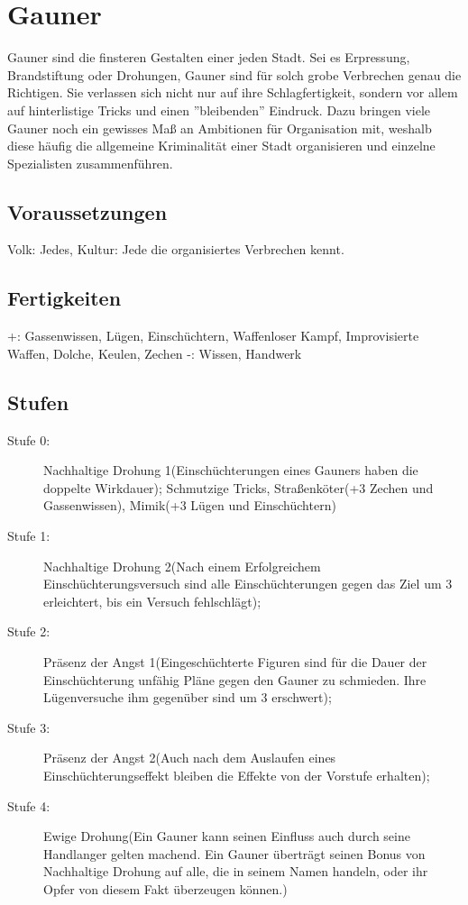 \documentclass[a4paper,12pt,oneside]{book}
\begin{document}
\section{Gauner}
Gauner sind die finsteren Gestalten einer jeden Stadt. Sei es Erpressung, Brandstiftung oder Drohungen, Gauner sind für solch grobe Verbrechen genau die Richtigen. Sie verlassen sich nicht nur auf ihre Schlagfertigkeit, sondern vor allem auf hinterlistige Tricks und einen ''bleibenden'' Eindruck. Dazu bringen viele Gauner noch ein gewisses Maß an Ambitionen für Organisation mit, weshalb diese häufig die allgemeine Kriminalität einer Stadt organisieren und einzelne Spezialisten zusammenführen.
\subsection{Voraussetzungen}
Volk: Jedes, Kultur: Jede die organisiertes Verbrechen kennt.
\subsection{Fertigkeiten}
+: Gassenwissen, Lügen, Einschüchtern, Waffenloser Kampf, Improvisierte Waffen, Dolche, Keulen, Zechen
-: Wissen, Handwerk
\subsection{Stufen}
\begin{description}
\item[Stufe 0:] Nachhaltige Drohung 1(Einschüchterungen eines Gauners haben die doppelte Wirkdauer); Schmutzige Tricks, Straßenköter(+3 Zechen und Gassenwissen), Mimik(+3 Lügen und Einschüchtern) 
\item[Stufe 1:] Nachhaltige Drohung 2(Nach einem Erfolgreichem Einschüchterungsversuch sind alle Einschüchterungen gegen das Ziel um 3 erleichtert, bis ein Versuch fehlschlägt);
\item[Stufe 2:] Präsenz der Angst 1(Eingeschüchterte Figuren sind für die Dauer der Einschüchterung unfähig Pläne gegen den Gauner zu schmieden. Ihre Lügenversuche ihm gegenüber sind um 3 erschwert);
\item[Stufe 3:] Präsenz der Angst 2(Auch nach dem Auslaufen eines Einschüchterungseffekt bleiben die Effekte von der Vorstufe erhalten);
\item[Stufe 4:] Ewige Drohung(Ein Gauner kann seinen Einfluss auch durch seine Handlanger gelten machend. Ein Gauner überträgt seinen Bonus von Nachhaltige Drohung auf alle, die in seinem Namen handeln, oder ihr Opfer von diesem Fakt überzeugen können.)
\end{description}
\end{document}
